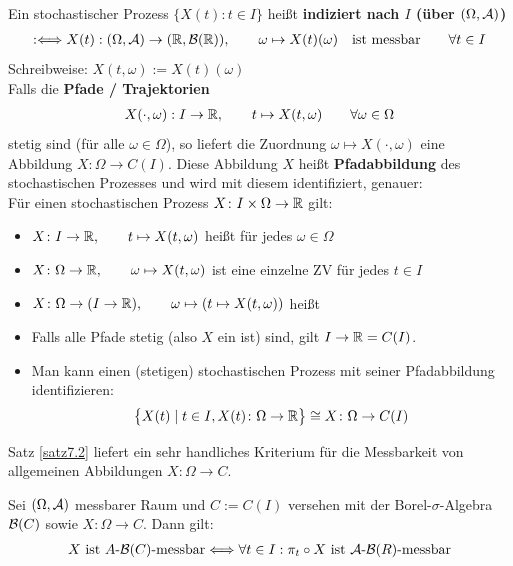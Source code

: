 \begin{defi}
	Ein stochastischer Prozess $\big\lbrace X(t):t\in I\big\rbrace$ heißt \textbf{indiziert nach $I$ (über $(\Omega,\mathcal{A})$)}
		\begin{align*}
	:\Longleftrightarrow X(t):(\Omega,\mathcal{A})\to(\mathbb{R},\mathcal{B}(\mathbb{R})),
		\qquad\omega\mapsto X(t)(\omega)\quad
		\text{ist messbar}\qquad\forall t\in I
	\end{align*}
	Schreibweise: $X(t,\omega):=X(t)(\omega)$\\
	Falls die \textbf{Pfade / Trajektorien}
	\begin{align*}
		X(\cdot,\omega):I\to\mathbb{R},\qquad t\mapsto X(t,\omega)\qquad\forall \omega\in\Omega
	\end{align*}
	stetig sind (für alle $\omega\in\Omega$), so liefert die Zuordnung $\omega\mapsto X(\cdot,\omega)$ eine Abbildung $X:\Omega\to C(I)$. 
	Diese Abbildung $X$ heißt \textbf{Pfadabbildung} des stochastischen Prozesses und wird mit diesem identifiziert, genauer:\\
	Für einen stochastischen Prozess $X\colon I\times\Omega\to\mathbb{R}$ gilt:
	\begin{itemize}
		\item $X\colon I\to\mathbb{R},\qquad t\mapsto X(t,\omega)$ heißt  für jedes $\omega\in\Omega$
		\item $X\colon\Omega\to\mathbb{R},\qquad\omega\mapsto X(t,\omega)$ ist eine einzelne ZV für jedes $t\in I$
		\item $X\colon\Omega\to (I\to\mathbb{R}),\qquad \omega\mapsto(t\mapsto X(t,\omega))$ heißt 
		\item Falls alle Pfade stetig (also $X$ ein  ist) sind, gilt $I\to\mathbb{R}=C(I)$.
		\item Man kann einen (stetigen) stochastischen Prozess mit seiner Pfadabbildung identifizieren:
		\begin{align}\label{eqIdentifiereSP}
			\big\lbrace X(t)\mid t\in I, X(t)\colon\Omega\to\mathbb{R}\big\rbrace
			\cong X\colon\Omega\to C(I)
		\end{align}
	\end{itemize}
\end{defi}

Satz \ref{satz7.2} liefert ein sehr handliches Kriterium für die Messbarkeit von allgemeinen Abbildungen $X:\Omega\to C$.

\begin{satz}\label{satz7.3}
	Sei $(\Omega,\mathcal{A})$ messbarer Raum und $C:=C(I)$ versehen mit der Borel-$\sigma$-Algebra $\mathcal{B}(C)$ sowie $X:\Omega\to C$. Dann gilt:
	\begin{align*}
		X\text{ ist }A\text{-}\mathcal{B}(C)\text{-messbar}\Longleftrightarrow\forall t\in I:\pi_t\circ X\text { ist }\mathcal{A}\text{-}\mathcal{B}(R)\text{-messbar}
	\end{align*}
\end{satz}

